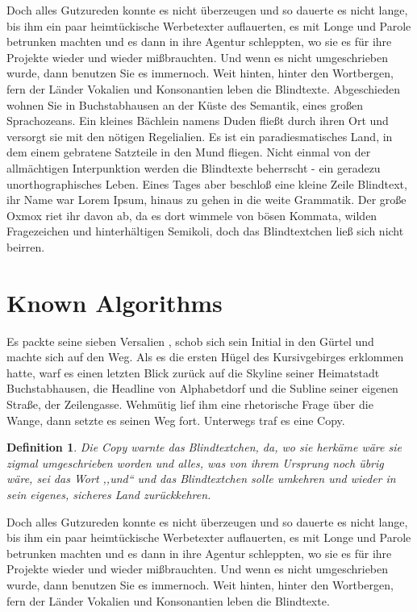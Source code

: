 \documentclass[12pt,a4paper,twoside]{scrartcl}
\newtheorem{definition}[theorem]{Definition}
\numberwithin{equation}{section}
\begin{document}
Doch alles Gutzureden konnte es nicht überzeugen und so dauerte es nicht lange, bis ihm ein paar heimtückische Werbetexter auflauerten, es mit Longe und Parole betrunken machten und es dann in ihre Agentur schleppten, wo sie es für ihre Projekte wieder und wieder mißbrauchten. Und wenn es nicht umgeschrieben wurde, dann benutzen Sie es immernoch. Weit hinten, hinter den Wortbergen, fern der Länder Vokalien und Konsonantien leben die Blindtexte. Abgeschieden wohnen Sie in Buchstabhausen an der Küste des Semantik, eines großen Sprachozeans. Ein kleines Bächlein namens Duden fließt durch ihren Ort und versorgt sie mit den nötigen Regelialien. Es ist ein paradiesmatisches Land, in dem einem gebratene Satzteile in den Mund fliegen. Nicht einmal von der allmächtigen Interpunktion werden die Blindtexte beherrscht - ein geradezu unorthographisches Leben. Eines Tages aber beschloß eine kleine Zeile Blindtext, ihr Name war Lorem Ipsum, hinaus zu gehen in die weite Grammatik. Der große Oxmox riet ihr davon ab, da es dort wimmele von bösen Kommata, wilden Fragezeichen und hinterhältigen Semikoli, doch das Blindtextchen ließ sich nicht beirren.


\section{Known Algorithms}

Es packte seine sieben Versalien \cite{Cormen2001introduction}, schob sich sein Initial in den Gürtel und machte sich auf den Weg. Als es die ersten Hügel des Kursivgebirges erklommen hatte, warf es einen letzten Blick zurück auf die Skyline seiner Heimatstadt Buchstabhausen, die Headline von Alphabetdorf und die Subline seiner eigenen Straße, der Zeilengasse. Wehmütig lief ihm eine rhetorische Frage über die Wange, dann \cite{Cormen2001introduction} setzte es seinen Weg fort. Unterwegs traf es eine Copy.
\begin{definition}\label{def:blind}
Die Copy warnte das Blindtextchen, da, wo sie herkäme wäre sie zigmal umgeschrieben worden und alles, was von ihrem Ursprung noch übrig wäre, sei das Wort ,,und`` und das Blindtextchen solle umkehren und wieder in sein eigenes, sicheres Land zurückkehren.
\end{definition}
Doch alles Gutzureden konnte es nicht überzeugen und so dauerte es nicht lange, bis ihm ein paar heimtückische Werbetexter auflauerten, es mit Longe und Parole betrunken machten und es dann in ihre Agentur schleppten, wo sie es für ihre Projekte wieder und wieder mißbrauchten. Und wenn es nicht umgeschrieben wurde, dann benutzen Sie es immernoch. Weit hinten, hinter den Wortbergen, fern der Länder Vokalien und Konsonantien leben die Blindtexte.
\end{document}
